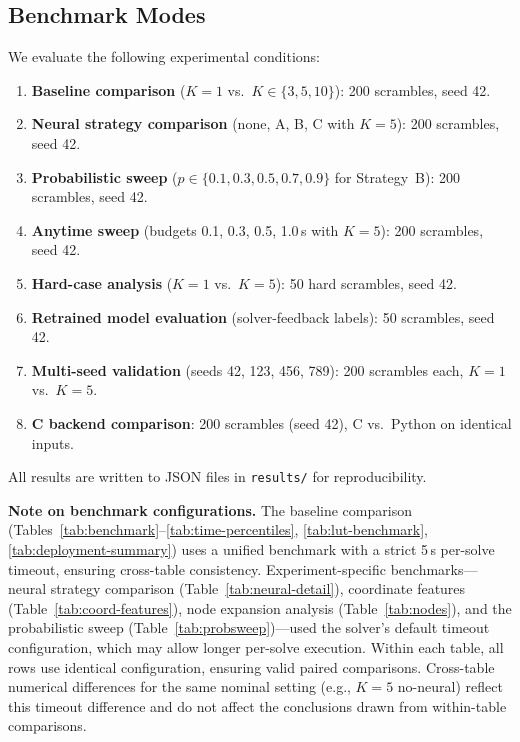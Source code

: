 \documentclass[conference]{IEEEtran}
\begin{document}
\subsection{Benchmark Modes}
We evaluate the following experimental conditions:

\begin{enumerate}[leftmargin=*]
  \item \textbf{Baseline comparison} ($K{=}1$ vs.\ $K \in \{3, 5, 10\}$): 200 scrambles, seed 42.
  \item \textbf{Neural strategy comparison} (none, A, B, C with $K{=}5$): 200 scrambles, seed 42.
  \item \textbf{Probabilistic sweep} ($p \in \{0.1, 0.3, 0.5, 0.7, 0.9\}$ for Strategy~B): 200 scrambles, seed 42.
  \item \textbf{Anytime sweep} (budgets 0.1, 0.3, 0.5, 1.0\,s with $K{=}5$): 200 scrambles, seed 42.
  \item \textbf{Hard-case analysis} ($K{=}1$ vs.\ $K{=}5$): 50 hard scrambles, seed 42.
  \item \textbf{Retrained model evaluation} (solver-feedback labels): 50 scrambles, seed 42.
  \item \textbf{Multi-seed validation} (seeds 42, 123, 456, 789): 200 scrambles each, $K{=}1$ vs.\ $K{=}5$.
  \item \textbf{C backend comparison}: 200 scrambles (seed 42), C vs.\ Python on identical inputs.
\end{enumerate}

All results are written to JSON files in \texttt{results/} for reproducibility.

\textbf{Note on benchmark configurations.} The baseline comparison (Tables~\ref{tab:benchmark}--\ref{tab:time-percentiles}, \ref{tab:lut-benchmark}, \ref{tab:deployment-summary}) uses a unified benchmark with a strict 5\,s per-solve timeout, ensuring cross-table consistency. Experiment-specific benchmarks---neural strategy comparison (Table~\ref{tab:neural-detail}), coordinate features (Table~\ref{tab:coord-features}), node expansion analysis (Table~\ref{tab:nodes}), and the probabilistic sweep (Table~\ref{tab:probsweep})---used the solver's default timeout configuration, which may allow longer per-solve execution. Within each table, all rows use identical configuration, ensuring valid paired comparisons. Cross-table numerical differences for the same nominal setting (e.g., $K{=}5$ no-neural) reflect this timeout difference and do not affect the conclusions drawn from within-table comparisons.
\end{document}
